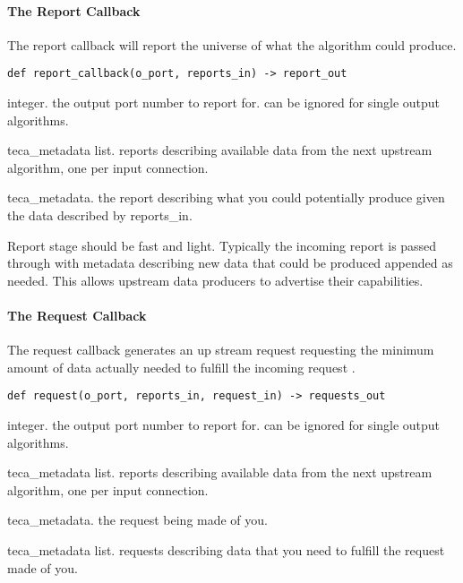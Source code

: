 \documentclass[a4paper,10pt,DIV=12]{scrreprt}
\begin{document}
\paragraph{The Report Callback}
The report callback will report the universe of what the algorithm could produce.

\begin{verbatim}
def report_callback(o_port, reports_in) -> report_out
\end{verbatim}
\noindent\hspace{0.25in}\begin{minipage}{0.8\textwidth}
\begin{description}
 \setlength\itemsep{0mm}
 \item[o\_port] integer. the output port number to report for. can be ignored for single output algorithms.
 \item[reports\_in] teca\_metadata list. reports describing available data from the next upstream algorithm, one per input connection.
 \item[report\_out] teca\_metadata. the report describing what you could potentially produce given the data described by reports\_in.
\end{description}
\vspace{2mm}
\end{minipage}

\noindent Report stage should be fast and light. Typically the incoming report is passed through with metadata describing new data that could be produced appended as needed. This allows upstream data producers to advertise their capabilities.

\paragraph{The Request Callback}
\noindent The request callback generates an up stream request requesting the minimum amount of data actually needed to fulfill the incoming request
.
\begin{verbatim}
def request(o_port, reports_in, request_in) -> requests_out
\end{verbatim}
\noindent\hspace{0.25in}\begin{minipage}{0.8\textwidth}
\begin{description}
 \setlength\itemsep{0mm}
 \item[o\_port] integer. the output port number to report for. can be ignored for single output algorithms.
 \item[reports\_in] teca\_metadata list. reports describing available data from the next upstream algorithm, one per input connection.
 \item[request\_in] teca\_metadata. the request being made of you.
 \item[report\_out] teca\_metadata list. requests describing data that you need to fulfill the request made of you.
\end{description}
\vspace{2mm}
\end{minipage}
\end{document}
